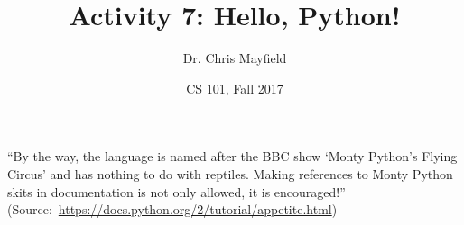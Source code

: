 \documentclass[12pt]{article}
\title{Activity 7: Hello, Python!}
\author{Dr. Chris Mayfield}
\date{CS 101, Fall 2017}
\begin{document}
\maketitle

``By the way, the language is named after the BBC show `Monty Python's Flying Circus' and has nothing to do with reptiles.
Making references to Monty Python skits in documentation is not only allowed, it is encouraged!''
(Source:~\url{https://docs.python.org/2/tutorial/appetite.html})



\end{document}
